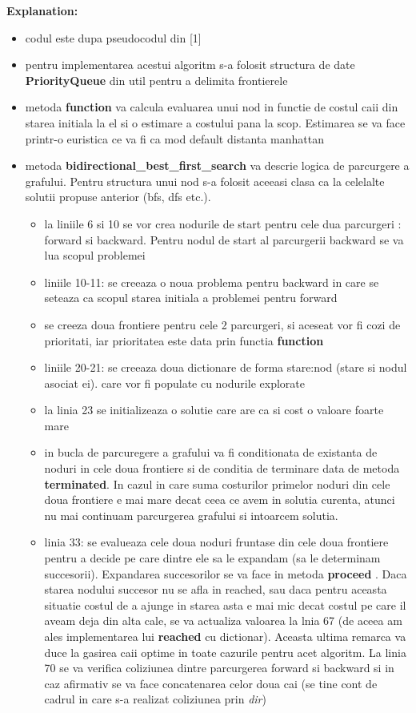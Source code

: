 \textbf{Explanation:}
\begin{itemize}
    \setlength\itemsep{0em}
    \item codul este dupa pseudocodul din [1]
    \item  pentru implementarea acestui algoritm s-a folosit structura de date \textbf{PriorityQueue} din util pentru a delimita frontierele
    \item metoda \textbf{function} va calcula evaluarea unui nod in functie de costul caii din starea initiala la el si o estimare a costului pana la scop. Estimarea se va face printr-o euristica ce va fi ca mod default distanta manhattan
    \item metoda \textbf{bidirectional\_best\_first\_search} va descrie logica de parcurgere a grafului. Pentru structura unui nod s-a folosit aceeasi clasa ca la celelalte solutii propuse anterior (bfs, dfs etc.). 
        \begin{itemize}
        \setlength\itemsep{0em}
        \item la liniile 6 si 10 se vor crea nodurile de start pentru cele dua parcurgeri : forward si backward. Pentru nodul de start al parcurgerii backward se va lua scopul problemei
        \item liniile 10-11: se creeaza o noua problema pentru backward in care se seteaza ca scopul starea initiala a problemei pentru forward
        \item se creeza doua frontiere pentru cele 2 parcurgeri, si aceseat vor fi cozi de prioritati, iar prioritatea este data prin functia \textbf{function}
        \item liniile 20-21: se creeaza doua dictionare de forma stare:nod (stare si nodul asociat ei). care vor fi populate cu nodurile explorate
        \item la linia 23 se initializeaza o solutie care are ca si cost o valoare foarte mare
        \item in bucla de parcuregere a grafului va fi conditionata de existanta de noduri in cele doua frontiere si de conditia de terminare data de metoda  \textbf{terminated}. In cazul in care suma costurilor primelor noduri din cele doua frontiere e mai mare decat ceea ce avem in solutia curenta, atunci nu mai continuam parcurgerea grafului si intoarcem solutia.
        \item linia 33: se evalueaza cele doua noduri fruntase din cele doua frontiere pentru a decide pe care dintre ele sa le expandam (sa le determinam succesorii). Expandarea succesorilor se va face in metoda \textbf{proceed} . Daca starea nodului succesor nu se afla in reached, sau daca pentru aceasta situatie costul de a ajunge in starea asta e mai mic decat costul pe care il aveam deja din alta cale, se va actualiza valoarea la lnia 67 (de aceea am ales implementarea lui \textbf{reached} cu dictionar). Aceasta ultima remarca va duce la gasirea caii optime in toate cazurile pentru acet algoritm.  La linia 70 se va verifica coliziunea dintre parcurgerea forward si backward si in caz afirmativ se va face concatenarea celor doua cai (se tine cont de cadrul in care s-a realizat coliziunea prin \textit{dir}) 

\end{itemize}
\end{itemize}
